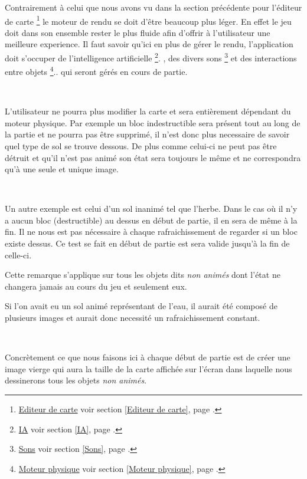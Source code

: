 			Contrairement à celui que nous avons vu dans la section précédente pour
			l'éditeur de carte
			\footnote{
				\hyperlink{Editeur de carte}{Editeur de carte}
				\og voir section \ref{Editeur de carte}, page \pageref{Editeur de carte}.\fg
			}
			le moteur de rendu se doit d'être beaucoup plus léger. En effet le jeu doit
			dans son ensemble rester le plus fluide afin d'offrir à l'utilisateur une meilleure
			experience. Il faut savoir qu'ici en plus de gérer le rendu, l'application
			doit s'occuper de l'intelligence artificielle
			\footnote{
				\hyperlink{IA}{IA}
				\og voir section \ref{IA}, page \pageref{IA}.\fg
			}.
			, des divers sons
			\footnote{
				\hyperlink{Sons}{Sons}
				\og voir section \ref{Sons}, page \pageref{Sons}.\fg
			} et des interactions entre objets
			 \footnote{
				\hyperlink{Moteur physique}{Moteur physique}
				\og voir section \ref{Moteur physique}, page \pageref{Moteur physique}.\fg
			}..
			qui seront gérés en cours de partie.		
			
			$\,$	
			
			L'utilisateur ne pourra plus modifier la carte et sera
			entièrement dépendant du moteur physique\footnotemark[3]. Par
			exemple un bloc indestructible sera présent tout au long de la
			partie et ne pourra pas être supprimé, il n'est donc plus necessaire de
			savoir quel type de sol se trouve dessous. De plus comme celui-ci ne peut pas
			être détruit et qu'il n'est pas animé son état sera toujours le même et ne
			correspondra qu'à une seule et unique image.
			
			$\,$			
			
			Un autre exemple est celui d'un sol inanimé tel que l'herbe. Dans le cas où
			il n'y a aucun bloc (destructible) au dessus en début de partie, il en sera
			de même à la fin. Il ne nous est pas nécessaire à chaque
			rafraichissement de regarder si un bloc existe dessus. Ce test se fait en
			début de partie est sera valide jusqu'à la fin de celle-ci.
			
			
			Cette remarque s'applique sur tous les objets dits \emph{non animés} dont
			l'état ne changera jamais au cours du jeu et seulement eux.
			
			
			Si l'on avait eu un sol animé représentant de l'eau, il aurait été composé de
			plusieurs images et aurait donc necessité un rafraichissement constant.

			$\,$
			
			Concrètement ce que nous faisons ici à chaque début de partie est de créer
			une image vierge qui aura la taille de la carte affichée sur l'écran dans
			laquelle nous dessinerons tous les objets \emph{non animés}.
			
